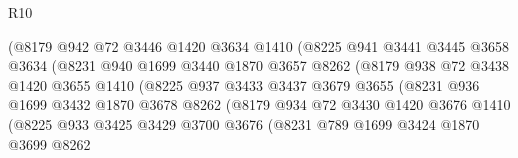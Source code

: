 \begin{lexlean}{R10}
\begin{coremodule}
                            (@8179
                              @942
                              @72
                              @3446
                              @1420
                              @3634
                              @1410
                              (@8225
                                @941
                                @3441
                                @3445
                                @3658
                                @3634
                                (@8231
                                  @940
                                  @1699
                                  @3440
                                  @1870
                                  @3657
                                  @8262
                                  (@8179
                                    @938
                                    @72
                                    @3438
                                    @1420
                                    @3655
                                    @1410
                                    (@8225
                                      @937
                                      @3433
                                      @3437
                                      @3679
                                      @3655
                                      (@8231
                                        @936
                                        @1699
                                        @3432
                                        @1870
                                        @3678
                                        @8262
                                        (@8179
                                          @934
                                          @72
                                          @3430
                                          @1420
                                          @3676
                                          @1410
                                          (@8225
                                            @933
                                            @3425
                                            @3429
                                            @3700
                                            @3676
                                            (@8231
                                              @789
                                              @1699
                                              @3424
                                              @1870
                                              @3699
                                              @8262

\end{coremodule}
\end{lexlean}
